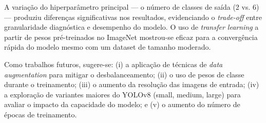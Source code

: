 \documentclass[12pt, a4paper]{article}
\begin{document}
A variação do hiperparâmetro principal --- o número de classes de saída (2 vs. 6) --- produziu diferenças significativas nos resultados, evidenciando o \textit{trade-off} entre granularidade diagnóstica e desempenho do modelo. O uso de \textit{transfer learning} a partir de pesos pré-treinados no ImageNet mostrou-se eficaz para a convergência rápida do modelo mesmo com um dataset de tamanho moderado.

Como trabalhos futuros, sugere-se: (i) a aplicação de técnicas de \textit{data augmentation} para mitigar o desbalanceamento; (ii) o uso de pesos de classe durante o treinamento; (iii) o aumento da resolução das imagens de entrada; (iv) a exploração de variantes maiores do YOLOv8 (small, medium, large) para avaliar o impacto da capacidade do modelo; e (v) o aumento do número de épocas de treinamento.
\end{document}
